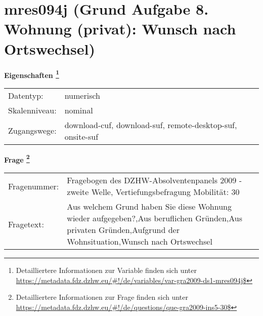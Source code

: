 
    \setcounter{footnote}{0}

    \vspace*{-1.8cm}
	\section{mres094j (Grund Aufgabe 8. Wohnung (privat): Wunsch nach Ortswechsel)}
	\label{section:mres094j}



    \vspace*{0.5cm}
    \noindent\textbf{Eigenschaften
	\footnote{Detailliertere Informationen zur Variable finden sich unter
		\url{https://metadata.fdz.dzhw.eu/\#!/de/variables/var-gra2009-ds1-mres094j$}}}\\
	\begin{tabularx}{\hsize}{@{}lX}
	Datentyp: & numerisch \\
	Skalenniveau: & nominal \\
	Zugangswege: &
	  download-cuf, 
	  download-suf, 
	  remote-desktop-suf, 
	  onsite-suf
 \\
    \end{tabularx}



				\vspace*{0.5cm}
                \noindent\textbf{Frage
	                \footnote{Detailliertere Informationen zur Frage finden sich unter
		              \url{https://metadata.fdz.dzhw.eu/\#!/de/questions/que-gra2009-ins5-30$}}}\\
				\begin{tabularx}{\hsize}{@{}lX}
					Fragenummer: &
					  Fragebogen des DZHW-Absolventenpanels 2009 - zweite Welle, Vertiefungsbefragung Mobilität:
					  30
 \\
					Fragetext: & Aus welchem Grund haben Sie diese Wohnung wieder aufgegeben?,Aus beruflichen Gründen,Aus privaten Gründen,Aufgrund der Wohnsituation,Wunsch nach Ortswechsel \\
				\end{tabularx}





